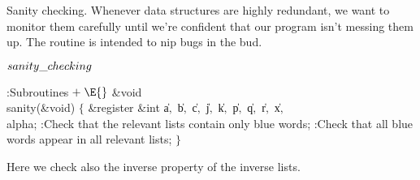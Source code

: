 Sanity checking. Whenever data structures are highly redundant,
we want to monitor them carefully until we're confident that our
program isn't messing them up. The  routine is intended to
nip bugs in the bud.

\Y\B\4\D$\\{sanity\_checking}$ \5
\par
\Y\B\4:Subroutines\X${}\mathrel+\E{}$\6
\&{void} \\{sanity}(\&{void})\1\1\2\2\6
${}\{{}$\1\6
\&{register} \&{int} \|a${},{}$ \|b${},{}$ \|c${},{}$ \|j${},{}$ \|k${},{}$ %
\|p${},{}$ \|q${},{}$ \|r${},{}$ \|x${},{}$ \\{alpha};\7
:Check that the relevant lists contain only blue words\X;\6
:Check that all blue words appear in all relevant lists\X;\6
\4${}\}{}$\2\par
\fi

Here we check also the inverse property of the inverse lists.

